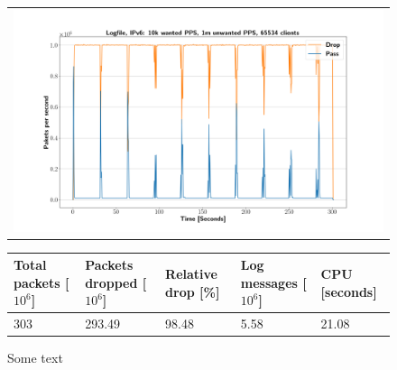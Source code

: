\begin{figure}[p]
	\label{fig:simplefail2ban:disk:ip6:1m}
	\centering
	\scriptsize
	\begin{tabular}{c}
    	\centerline{\includegraphics[width=1.2\textwidth]{images/simplefail2ban_disk_ipv6_v10k_iv1m_c65534.png}}
	\end{tabular}
	\begin{tabular}{lllll}
		\toprule
		\textbf{Total packets [$10^6$]} & \textbf{Packets dropped [$10^6$]} & \textbf{Relative drop [\%]} & \textbf{Log messages [$10^6$]} & \textbf{CPU [seconds]} \\ \midrule 
		303 & 293.49 & 98.48 & 5.58 & 21.08 \\
		\bottomrule
	\end{tabular}
	\caption[Simplefail2ban, Logfile IPv6, 1m \ac{PPS}]{Some text}
\end{figure}

